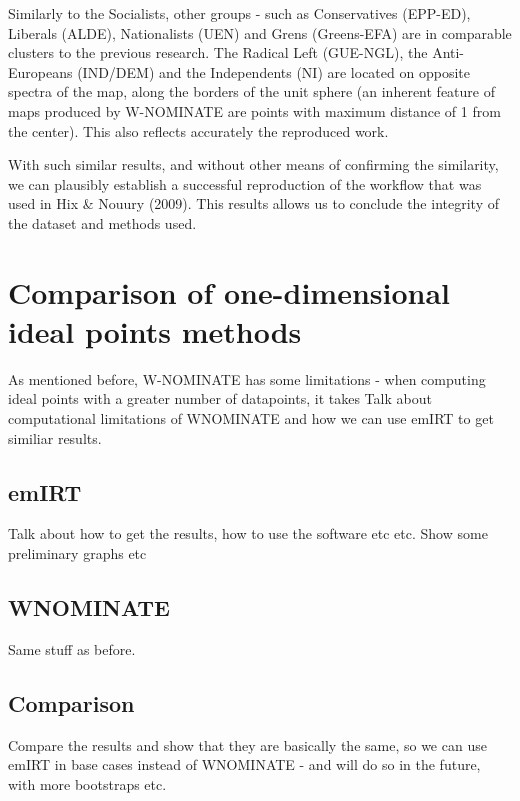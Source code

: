 \documentclass{report}
\begin{document}
                Similarly to the Socialists, other groups - such as Conservatives (EPP-ED), Liberals (ALDE),
                Nationalists (UEN) and Grens (Greens-EFA) are in comparable clusters to the previous research. The
                Radical Left (GUE-NGL), the Anti-Europeans (IND/DEM) and the Independents (NI) are located on
                opposite spectra of the map, along the borders of the unit sphere (an inherent feature of maps
                produced by W-NOMINATE are points with maximum distance of 1 from the center). This also reflects
                accurately the reproduced work.

                With such similar results, and without other means of confirming the similarity, we can plausibly
                establish a successful reproduction of the workflow that was used in Hix & Nouury (2009). This
                results allows us to conclude the integrity of the dataset and methods used.


        \section{Comparison of one-dimensional ideal points methods}
            As mentioned before, W-NOMINATE has some limitations - when computing ideal points with a greater number
            of datapoints, it takes
            Talk about computational limitations of WNOMINATE and how we can use emIRT to get similiar results.

            \subsection{emIRT}
                Talk about how to get the results, how to use the software etc etc. Show some preliminary graphs etc

            \subsection{WNOMINATE}
                Same stuff as before.

            \subsection{Comparison}
                Compare the results and show that they are basically the same, so we can use emIRT in base cases instead
                of WNOMINATE - and will do so in the future, with more bootstraps etc.
\end{document}
